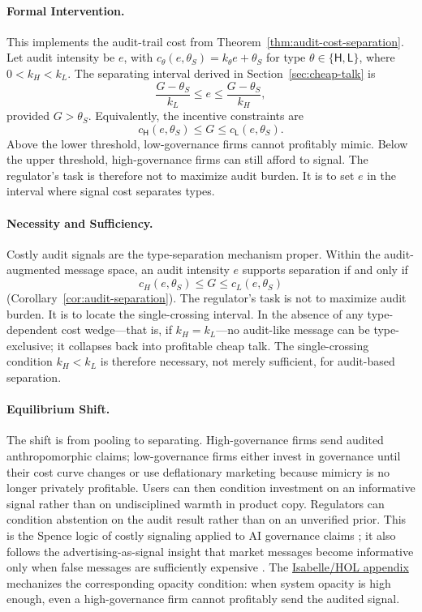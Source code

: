 \documentclass[review,authoryear]{elsarticle}
\theoremstyle{definition}
\theoremstyle{plain}
\begin{document}
\paragraph{Formal Intervention.}
This implements the audit-trail cost from Theorem~\ref{thm:audit-cost-separation}.
Let audit intensity be $e$, with $c_\theta(e,\theta_S)=k_\theta e+\theta_S$ for
type $\theta\in\{\mathsf{H},\mathsf{L}\}$, where $0<k_H<k_L$. The separating
interval derived in Section~\ref{sec:cheap-talk} is
\[
\frac{G-\theta_S}{k_L}\leq e\leq \frac{G-\theta_S}{k_H},
\]
provided $G>\theta_S$. Equivalently, the incentive constraints are
\[
c_\mathsf{H}(e,\theta_S)\leq G \leq c_\mathsf{L}(e,\theta_S).
\]
Above the lower threshold, low-governance firms cannot profitably mimic. Below
the upper threshold, high-governance firms can still afford to signal. The
regulator's task is therefore not to maximize audit burden. It is to set $e$ in
the interval where signal cost separates types.

\paragraph{Necessity and Sufficiency.}
Costly audit signals are the type-separation mechanism proper.  Within the
audit-augmented message space, an audit intensity $e$ supports separation if
and only if
\[
c_H(e,\theta_S)\le G \le c_L(e,\theta_S)
\]
(Corollary~\ref{cor:audit-separation}).  The regulator's task is not to
maximize audit burden.  It is to locate the single-crossing interval.
In the absence of any type-dependent cost wedge---that is, if $k_H=k_L$---no
audit-like message can be type-exclusive; it collapses back into profitable
cheap talk.  The single-crossing condition $k_H<k_L$ is therefore necessary,
not merely sufficient, for audit-based separation.

\paragraph{Equilibrium Shift.}
The shift is from pooling to separating. High-governance firms send audited
anthropomorphic claims; low-governance firms either invest in governance until
their cost curve changes or use deflationary marketing because mimicry is no longer privately profitable. Users can then condition
investment on an informative signal rather than on undisciplined warmth in
product copy. Regulators can condition abstention on the audit result rather
than on an unverified prior. This is the Spence logic of costly signaling
applied to AI governance claims \citep{spence1973}; it also follows the
advertising-as-signal insight that market messages become informative only when
false messages are sufficiently expensive \citep{milgrom_roberts1986}. The \hyperref[app:isabelle]{Isabelle/HOL appendix} mechanizes the corresponding opacity condition: when system opacity is high enough, even a high-governance firm cannot profitably send the audited signal.
\end{document}
